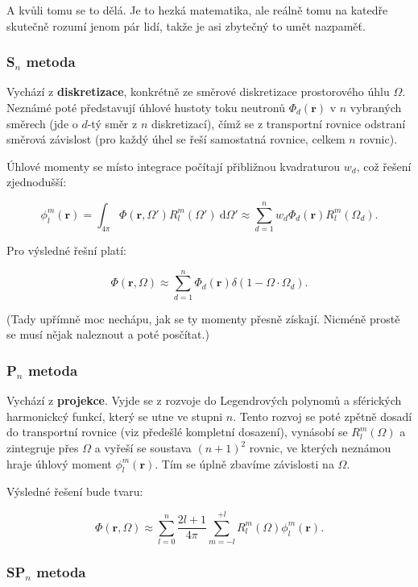 A kvůli tomu se to dělá. Je to hezká matematika, ale reálně tomu na katedře skutečně rozumí jenom pár lidí, takže je asi zbytečný to umět nazpaměť.

\subsubsection{S$_n$ metoda}

Vychází z \textbf{diskretizace}, konkrétně ze směrové diskretizace prostorového úhlu $\Omega$. Neznámé poté představují úhlové hustoty toku neutronů $\Phi_d(\textbf{r})$ v $n$ vybraných směrech (jde o $d$-tý směr z $n$ diskretizací), čímž se z transportní rovnice odstraní směrová závislost (pro každý úhel se řeší samostatná rovnice, celkem $n$ rovnic).

Úhlové momenty se místo integrace počítají přibližnou kvadraturou $w_d$, což řešení zjednodušší:

$$\phi_l^m(\textbf{r}) = \int_{4 \pi} \Phi(\textbf{r}, \Omega') R_l^m (\Omega') \: \text{d}\Omega' \approx \sum_{d=1}^{n} w_d \Phi_d(\textbf{r}) R_l^m(\Omega_d). $$

Pro výsledné řešní platí:

$$\Phi(\textbf{r}, \Omega) \approx \sum_{d=1}^{n} \Phi_d(\textbf{r}) \delta(1-\Omega \cdot \Omega_d).$$

(Tady upřímně moc nechápu, jak se ty momenty přesně získají. Nicméně prostě se musí nějak naleznout a poté posčítat.)

\subsubsection{P$_n$ metoda}

Vychází z \textbf{projekce}. Vyjde se z rozvoje do Legendrových polynomů a sférických harmonickcý funkcí, který se utne ve stupni $n$. Tento rozvoj se poté zpětně dosadí do transportní rovnice (viz předešlé kompletní dosazení), vynásobí se $R_l^m(\Omega)$ a zintegruje přes $\Omega$ a vyřeší se soustava $(n+1)^2$ rovnic, ve kterých neznámou hraje úhlový moment $\phi_l^m(\textbf{r})$. Tím se úplně zbavíme závislosti na $\Omega$. 

Výsledné řešení bude tvaru:

$$\Phi(\textbf{r}, \Omega) \approx \sum_{l=0}^{n} \dfrac{2l + 1}{4 \pi} \sum_{m=-l}^{+l} R_l^m(\Omega)  \phi_l^m(\textbf{r}). $$

\subsubsection{SP$_n$ metoda}


